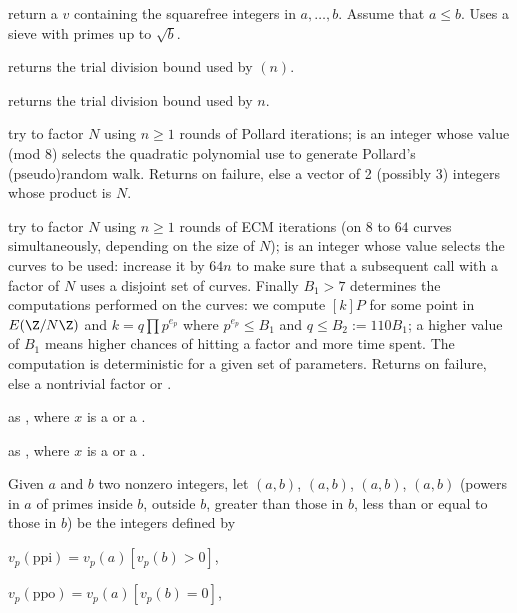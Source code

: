  return a  $v$
containing the squarefree integers in $a,\dots,b$. Assume that
$a\leq b$. Uses a sieve with primes up to $\sqrt{b}$.

 returns the trial division bound used by
$(n)$.

 returns the trial division bound used
by $n$.

 try to factor
 $N$ using $n\geq 1$ rounds of Pollard iterations;  is an
integer whose value (mod $8$) selects the quadratic polynomial use to
generate Pollard's (pseudo)random walk. Returns  on failure, else a
vector of 2 (possibly 3) integers whose product is $N$.

 try to
factor  $N$ using $n\geq 1$ rounds of ECM iterations (on $8$ to $64$
curves simultaneously, depending on the size of $N$);  is an
integer whose value selects the curves to be used: increase it by $64n$ to
make sure that a subsequent call with a factor of $N$ uses a disjoint set of
curves.
Finally $B_1 > 7$ determines the computations performed on the
curves: we compute $[k]P$ for some point in $E(\Z/N\Z)$ and $k = q \prod
p^{e_p}$ where $p^{e_p} \leq B_1$ and $q \leq B_2 := 110 B_1$; a higher value
of $B_1$ means higher chances of hitting a factor and more time spent.
The computation is deterministic for a given set of parameters. Returns
 on failure, else a nontrivial factor or .

 as , where $x$ is a  or
a .

 as , where
$x$ is a  or a .


Given $a$ and $b$ two nonzero integers, let $(a,b)$, $(a,b)$,
$(a,b)$, $(a,b)$ (powers in $a$ of primes inside $b$,
outside $b$, greater than those in $b$, less than or equal to those in $b$) be
the integers defined by

\item $v_p(\text{ppi}) = v_p(a) [v_p(b) > 0]$,

\item $v_p(\text{ppo}) = v_p(a) [v_p(b) = 0]$,

